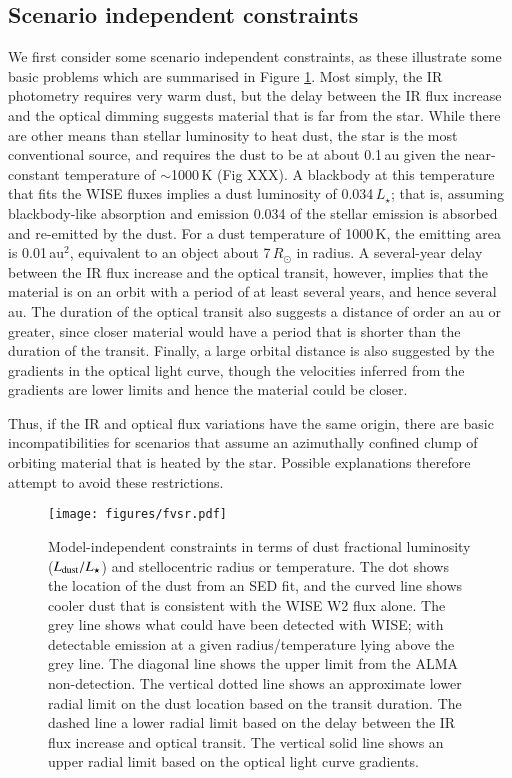 \documentclass{aa}
\begin{document}
\subsection{Scenario independent constraints}

We first consider some scenario independent constraints, as these illustrate some basic problems which are summarised in Figure \ref{fig:constr}.
%
Most simply, the IR photometry requires very warm dust, but the delay between the IR flux increase and the optical dimming suggests material that is far from the star.
%
While there are other means than stellar luminosity to heat dust, the star is the most conventional source, and requires the dust to be at about 0.1\,au given the near-constant temperature of $\sim$1000\,K (Fig XXX). A blackbody at this temperature that fits the WISE fluxes implies a dust luminosity of 0.034\,$L_\star$; that is, assuming blackbody-like absorption and emission 0.034 of the stellar emission is absorbed and re-emitted by the dust. For a dust temperature of 1000\,K, the emitting area is 0.01\,au$^2$, equivalent to an object about 7\,$R_\odot$ in radius.
%
A several-year delay between the IR flux increase and the optical transit, however, implies that the material is on an orbit with a period of at least several years, and hence several au.
%
The duration of the optical transit also suggests a distance of order an au or greater, since closer material would have a period that is shorter than the duration of the transit.
%
Finally, a large orbital distance is also suggested by the gradients in the optical light curve, though the velocities inferred from the gradients are lower limits and hence the material could be closer.

Thus, if the IR and optical flux variations have the same origin, there are basic incompatibilities for scenarios that assume an azimuthally confined clump of orbiting material that is heated by the star.
%
Possible explanations therefore attempt to avoid these restrictions.

\begin{figure}
    \centering
    \texttt{[image: figures/fvsr.pdf]}
    \caption{Model-independent constraints in terms of dust fractional luminosity ($L_{\rm dust}/L_\star$) and stellocentric radius or temperature.
    The dot shows the location of the dust from an SED fit, and the curved line shows cooler dust that is consistent with the WISE W2 flux alone. The grey line shows what could have been detected with WISE; with detectable emission at a given radius/temperature lying above the grey line.
    The diagonal line shows the upper limit from the ALMA non-detection.
    The vertical dotted line shows an approximate lower radial limit on the dust location based on the transit duration.
    The dashed line a lower radial limit based on the delay between the IR flux increase and optical transit.
    The vertical solid line shows an upper radial limit based on the optical light curve gradients.}
    \label{fig:constr}
\end{figure}
\end{document}
